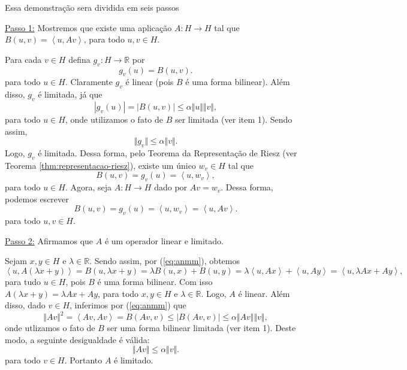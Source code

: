 \documentclass[a4paper, 11pt]{book}
\theoremstyle{definition}
\newcommand{\bR}{\mathbb{R}}
\begin{document}
\begin{prf}
    Essa demonstração sera dividida em seis passos

    \underline{Passo 1:} Mostremos que existe uma aplicação $A : H \to H$ tal que $B(u,v) = \left\langle u, Av \right\rangle$, para todo $u,v \in H$.

    Para cada $v \in H$ defina $g_v : H \to \bR$ por
    \[
        g_v(u) = B(u,v).
    \]
    para todo $u \in H$.
    Claramente $g_v$ é linear (pois $B$ é uma forma bilinear).
    Além disso, $g_v$ é limitada, já que
    \[
        |g_v(u)| = |B(u,v)| \leqslant \alpha \Vert u \Vert \Vert v \Vert,
    \]
    para todo $u \in H$, onde utilizamos o fato de $B$ ser limitada (ver item 1).
    Sendo assim,
    \[
        \Vert g_v \Vert \leqslant \alpha \Vert v \Vert.
    \]
    Logo, $g_v$ é limitada.
    Dessa forma, pelo Teorema da Representação de Riesz (ver Teorema \ref{thm:representacao-riesz}), existe um único $w_v \in H$ tal que
    \[
        B(u,v) = g_v(u) = \left\langle u, w_v \right\rangle,
    \]
    para todo $u \in H$.
    Agora, seja $A : H \to H$ dado por $Av = w_v$.
    Dessa forma, podemos escrever
    \begin{equation} \label{eq:anmm}
        B(u,v) = g_v(u) = \left\langle u,w_v \right\rangle = \left\langle u, Av \right\rangle.
    \end{equation}
    para todo $u,v \in H$.

    \underline{Passo 2:} Afirmamos que $A$ é um operador linear e limitado.

    Sejam $x, y \in H$ e $\lambda \in \bR$.
    Sendo assim, por (\ref{eq:anmm}), obtemos
    \[
        \left\langle u, A(\lambda x + y) \right\rangle = B(u, \lambda x + y) = \lambda B(u,x) + B(u,y) = \lambda \left\langle u, Ax \right\rangle + \left\langle u, Ay \right\rangle = \left\langle u, \lambda Ax + Ay \right\rangle,
    \]
    para tudo $u \in H$,
    pois $B$ é uma forma bilinear.
    Com isso $A(\lambda x + y) = \lambda Ax + Ay$, para todo $x,y \in H$ e $\lambda \in \bR$.
    Logo, $A$ é linear.
    Além disso, dado $v \in H$, inferimos por (\ref{eq:anmm}) que
    \[
        \Vert Av \Vert^2 = \left\langle Av, Av \right\rangle = B(Av, v) \leqslant |B(Av, v)| \leqslant \alpha \Vert Av \Vert \Vert v \Vert,
    \]
    onde utlizamos o fato de $B$ ser uma forma bilinear limitada (ver item 1). Deste modo, a seguinte desigualdade é válida:
    \[
        \Vert Av \Vert \leqslant \alpha \Vert v \Vert.
    \]
    para todo $v \in H$.
    Portanto $A$ é limitado.


\end{prf}
\end{document}
